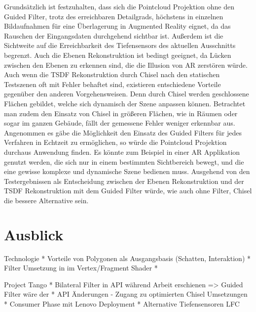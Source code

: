 Grundsätzlich ist festzuhalten, dass sich die Pointcloud Projektion ohne den Guided Filter, trotz des erreichbaren Detailgrads, höchstens in einzelnen Bildaufnahmen für eine Überlagerung in Augmented Reality eignet, da das Rauschen der Eingangsdaten durchgehend sichtbar ist. Außerdem ist die Sichtweite auf die Erreichbarkeit des Tiefensensors des aktuellen Ausschnitts begrenzt. Auch die Ebenen Rekonstruktion ist bedingt geeignet, da Lücken zwischen den Ebenen zu erkennen sind, die die Illusion von AR zerstören würde. Auch wenn die TSDF Rekonstruktion durch Chisel nach den statischen Testszenen oft mit Fehler behaftet sind, existieren entschiedene Vorteile gegenüber den anderen Vorgehensweisen. Denn durch Chisel werden geschlossene Flächen gebildet, welche sich dynamisch der Szene anpassen können. Betrachtet man zudem den Einsatz von Chisel in größeren Flächen, wie in Räumen oder sogar im ganzen Gebäude, fällt der gemessene Fehler weniger erkennbar aus.\\

Angenommen es gäbe die Möglichkeit den Einsatz des Guided Filters für jedes Verfahren in Echtzeit zu ermöglichen, so würde die Pointcloud Projektion durchaus Anwendung finden. Es könnte zum Beispiel in einer AR Applikation genutzt werden, die sich nur in einem bestimmten Sichtbereich bewegt, und die eine gewisse komplexe und dynamische Szene bedienen muss. Ausgehend von den Testergebnissen als Entscheidung zwischen der Ebenen Rekonstruktion und der TSDF Rekonstruktion mit dem Guided Filter würde, wie auch ohne Filter, Chisel die bessere Alternative sein.


\section{Ausblick}



Technologie
* Vorteile von Polygonen als Ausgangsbasis (Schatten, Interaktion)
* Filter Umsetzung in im Vertex/Fragment Shader
* 

Project Tango
* Bilateral Filter in API während Arbeit erschienen => Guided Filter wäre der
* API Änderungen - Zugang zu optimierten Chisel Umsetzungen
* Consumer Phase mit Lenovo Deployment
* Alternative Tiefensensoren LFC


	
	